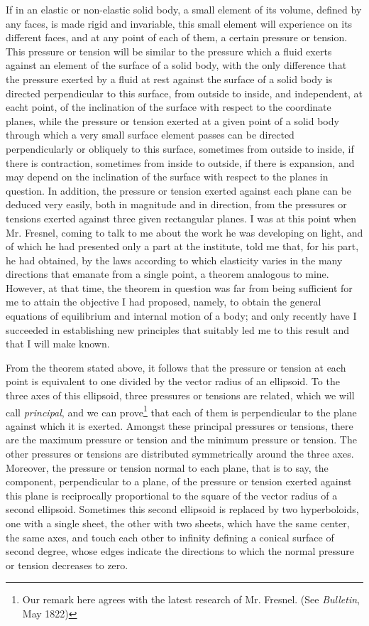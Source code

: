 \documentclass[openright,smallroyalvopaper,8pt,twoside,showtrims]{memoir}
\begin{document}
If in an elastic or non-elastic solid body, a small element of its volume, defined by any faces, is made rigid and invariable, this small element will experience on its different faces, and at any point of each of them, a certain pressure or tension. This pressure or tension will be similar to the pressure which a fluid exerts against an element of the surface of a solid body, with the only difference that the pressure exerted by a fluid at rest against the surface of a solid body is directed perpendicular to this surface, from outside to inside, and independent, at eacht point, of the inclination of the surface with respect to the coordinate planes, while the pressure or tension exerted at a given point of a solid body through which a very small surface element passes can be directed perpendicularly or obliquely to this surface, sometimes from outside to inside, if there is contraction, sometimes from inside to outside, if there is expansion, and may depend on the inclination of the surface with respect to the planes in question. In addition, the pressure or tension exerted against each plane can be deduced very easily, both in magnitude and in direction, from the pressures or tensions exerted against three given rectangular planes. I was at this point when Mr. Fresnel, coming to talk to me about the work he was developing on light, and of which he had presented only a part at the institute, told me that, for his part, he had obtained, by the laws according to which elasticity varies in the many directions that emanate from a single point, a theorem analogous to mine. However, at that time, the theorem in question was far from being sufficient for me to attain the objective I had proposed, namely, to obtain the general equations of equilibrium and internal motion of a body; and only recently have I  succeeded in establishing new principles that suitably led me to this result and that I will make known. 


From the theorem stated above, it follows that the pressure or tension at each point is equivalent to one divided by the vector radius of an ellipsoid. To the three axes of this ellipsoid, three pressures or tensions are related, which we will call \emph{principal}, and we can prove\footnote{Our remark here agrees with the latest research of Mr. Fresnel. (See \emph{Bulletin}, May 1822)} that each of them is perpendicular to the plane against which it is exerted. Amongst these principal pressures or tensions, there are the maximum pressure or tension and the minimum pressure or tension. The other pressures or tensions are distributed symmetrically around the three axes. Moreover, the pressure or tension normal to each plane, that is to say, the component, perpendicular to a plane, of the pressure or tension exerted against this plane is reciprocally proportional to the square of the vector radius of a second ellipsoid. Sometimes this second ellipsoid is replaced by two hyperboloids, one with a single sheet, the other with two sheets, which have the same center, the same axes, and touch each other to infinity defining a conical surface of second degree, whose edges indicate the directions to which the normal pressure or tension decreases to zero. 
\end{document}
